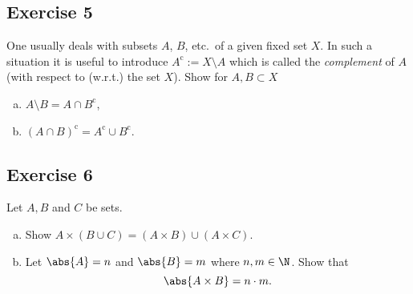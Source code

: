 \subsection*{Exercise 5}
One usually deals with subsets $A$, $B$, etc.\ of a given fixed set $X$. 
In such a situation it is useful to introduce $A^{\text{c}} := X \setminus A$ which is called the \emph{complement} of $A$ (with respect to (w.r.t.) the set $X$). 
Show for $A,B \subset X$
\begin{enumerate}[(a)]
	\item
	$A \setminus B = A \cap B^{\text{c}}$, 
	
	\item
	$(A \cap B)^{\text{c}} = A^{\text{c}} \cup B^{\text{c}}$. 
\end{enumerate}


\subsection*{Exercise 6}
Let $A,B$ and $C$ be sets. 
\begin{enumerate}[(a)]
	\item
	Show $A \times (B \cup C) = (A \times B) \cup (A \times C)$. 
	
	\item
	Let $\abs{A}=n$ and $\abs{B}=m$ where $n,m \in \N$. 
	Show that
	\[
	\abs{A \times B} = n \cdot m. 
	\]	
\end{enumerate}



